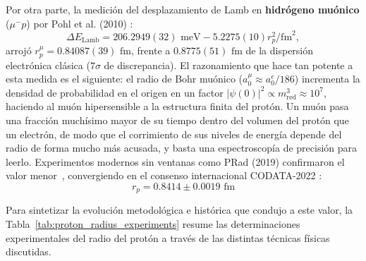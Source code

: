 \documentclass[10pt,a4paper]{article}
\begin{document}
Por otra parte, la medición del desplazamiento de Lamb en \textbf{hidrógeno muónico} ($\mu^- p$) por Pohl et al. (2010) \cite{pohl2010,antognini2013}:
\begin{equation}
\Delta E_{\text{Lamb}} = 206.2949(32)\text{ meV} - 5.2275(10) r_p^2 / \text{fm}^2,
\end{equation}
arrojó $r_p^\mu = 0.84087(39)\text{ fm}$, frente a $0.8775(51)\text{ fm}$ de la dispersión electrónica clásica ($7\sigma$ de discrepancia). El razonamiento que hace tan potente a esta medida es el siguiente: el radio de Bohr muónico ($a_0^\mu \approx a_0^e / 186$) incrementa la densidad de probabilidad en el origen en un factor $|\psi(0)|^2 \propto m_{\text{red}}^3 \approx 10^7$, haciendo al muón hipersensible a la estructura finita del protón. Un muón pasa una fracción muchísimo mayor de su tiempo dentro del volumen del protón que un electrón, de modo que el corrimiento de sus niveles de energía depende del radio de forma mucho más acusada, y basta una espectroscopía de precisión para leerlo. Experimentos modernos sin ventanas como PRad (2019) confirmaron el valor menor~\cite{xiong2019}, convergiendo en el consenso internacional CODATA-2022 \cite{tiesinga2021,pdg2022}:
\begin{equation}
\boxed{r_p = 0.8414 \pm 0.0019\text{ fm}}
\end{equation}

Para sintetizar la evolución metodológica e histórica que condujo a este valor, la Tabla~\ref{tab:proton_radius_experiments} resume las determinaciones experimentales del radio del protón a través de las distintas técnicas físicas discutidas.
\end{document}
